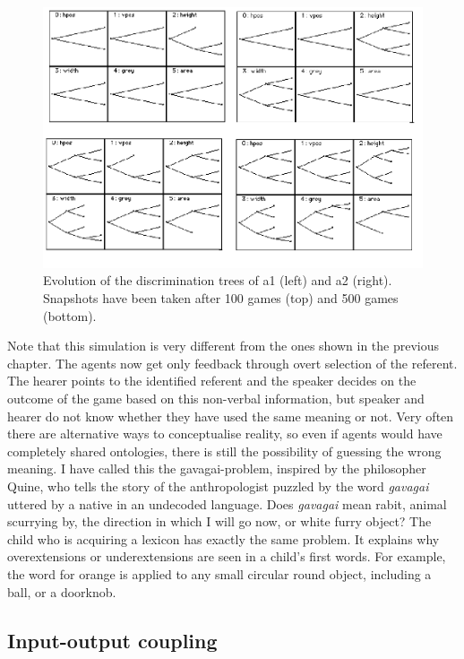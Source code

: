 \begin{figure}[htbp]
  \centerline{\includegraphics[width=\textwidth]{chap6/figs/gdis.pdf}}
\caption{\label{gdis1}Evolution of the discrimination
trees of {\bfshape  a1} (left) and {\bfshape  a2} (right).
Snapshots have been taken after 100 games (top) and 500 
games (bottom).} 
\end{figure}

Note that this simulation is very different from the 
ones shown in the previous chapter. The agents now get 
only feedback through overt selection of the referent. 
The hearer points to the identified referent and the speaker 
decides on the outcome of the game based on this 
non-verbal information, but speaker and hearer do not 
know whether they have used the same meaning or not. 
Very often there are alternative ways
to conceptualise reality, so even if agents would have
completely shared ontologies, there is still the possibility 
of guessing the wrong meaning. I have called this
the gavagai-problem, inspired by the philosopher
Quine, who tells the story of the anthropologist 
puzzled by the word \textit{gavagai} uttered by a native 
in an undecoded language. Does \textit{gavagai} mean rabit, animal 
scurrying by, the direction in which I will go 
now, or white furry object? 
The child who is acquiring a lexicon has
exactly the same problem. It explains why 
overextensions or underextensions
are seen in a child's first words. For example, 
the word for orange is applied to any small circular round 
object, including a ball, or a doorknob.

\subsection{Input-output coupling}

